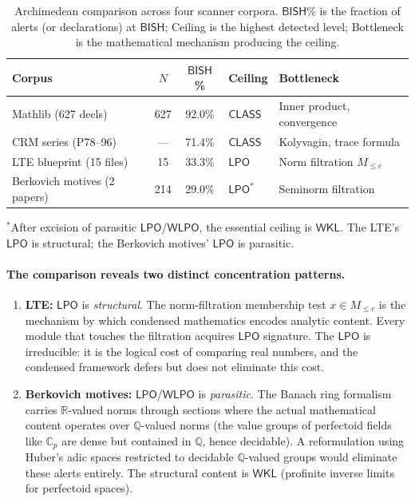 \documentclass[11pt,a4paper]{article}
\theoremstyle{plain}
\theoremstyle{definition}
\newcommand{\BISH}{\textsf{BISH}}
\newcommand{\WKL}{\textsf{WKL}}
\newcommand{\WLPO}{\textsf{WLPO}}
\newcommand{\LPO}{\textsf{LPO}}
\newcommand{\CLASS}{\textsf{CLASS}}
\newcommand{\Q}{\mathbb{Q}}
\newcommand{\R}{\mathbb{R}}
\newcommand{\C}{\mathbb{C}}
\begin{document}
\begin{table}[h]
\centering
\caption{Archimedean comparison across four scanner corpora.  $\BISH$\% is the fraction of alerts (or declarations) at $\BISH$; Ceiling is the highest detected level; Bottleneck is the mathematical mechanism producing the ceiling.}
\label{tab:archimedean-comparison}
\begin{tabular}{@{}lccll@{}}
\toprule
\textbf{Corpus} & \textbf{$N$} & \textbf{$\BISH$\%} & \textbf{Ceiling} & \textbf{Bottleneck} \\
\midrule
Mathlib (627 decls)       & 627 & 92.0\% & $\CLASS$ & Inner product, convergence \\
CRM series (P78--96)      & ---  & 71.4\% & $\CLASS$ & Kolyvagin, trace formula \\
LTE blueprint (15 files)  &  15 & 33.3\% & $\LPO$   & Norm filtration $M_{\leq c}$ \\
Berkovich motives (2 papers) & 214 & 29.0\% & $\LPO^*$ & Seminorm filtration \\
\bottomrule
\end{tabular}

\smallskip
{\footnotesize ${}^*$After excision of parasitic $\LPO$/$\WLPO$, the essential ceiling is $\WKL$. The LTE's $\LPO$ is structural; the Berkovich motives' $\LPO$ is parasitic.}
\end{table}

\paragraph{The comparison reveals two distinct concentration patterns.}

\begin{enumerate}[label=(\roman*)]
\item \textbf{LTE:} $\LPO$ is \emph{structural}.  The norm-filtration membership test $x \in M_{\leq c}$ is the mechanism by which condensed mathematics encodes analytic content.  Every module that touches the filtration acquires $\LPO$ signature.  The $\LPO$ is irreducible: it is the logical cost of comparing real numbers, and the condensed framework defers but does not eliminate this cost.

\item \textbf{Berkovich motives:} $\LPO$/$\WLPO$ is \emph{parasitic}.  The Banach ring formalism carries $\R$-valued norms through sections where the actual mathematical content operates over $\Q$-valued norms (the value groups of perfectoid fields like $\C_p$ are dense but contained in $\Q$, hence decidable).  A reformulation using Huber's adic spaces restricted to decidable $\Q$-valued groups would eliminate these alerts entirely.  The structural content is $\WKL$ (profinite inverse limits for perfectoid spaces).
\end{enumerate}
\end{document}
